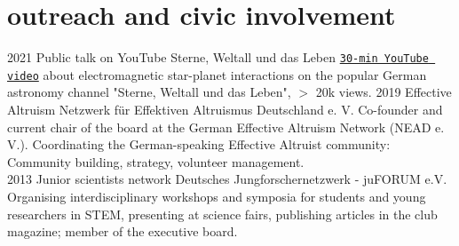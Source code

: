 \documentclass[]{k-cv} %
\begin{document}
\section{outreach and civic involvement}
\begin{entrylist}
\entry
{2021}
{Public talk on YouTube}
{Sterne, Weltall und das Leben}
{\texttt{\href{https://www.youtube.com/watch?v=LLHLobUifeY}{30-min YouTube video}} about electromagnetic star-planet interactions on the popular German astronomy channel "Sterne, Weltall und das Leben", $>$ 20k views.}
\entry
{2019 }
{Effective Altruism}
{Netzwerk f\"ur Effektiven Altruismus Deutschland e. V.}
{Co-founder and current chair of the board at the German Effective Altruism Network (NEAD e. V.). Coordinating the German-speaking Effective Altruist community: Community building, strategy, volunteer management.\\}
\entry
{2013 }
{Junior scientists network}
{Deutsches Jungforschernetzwerk - juFORUM e.V.}
{Organising interdisciplinary workshops and symposia for students and young researchers in STEM, presenting at science fairs, publishing articles in the club magazine; member of the executive board.}
\end{entrylist}
\end{document}
